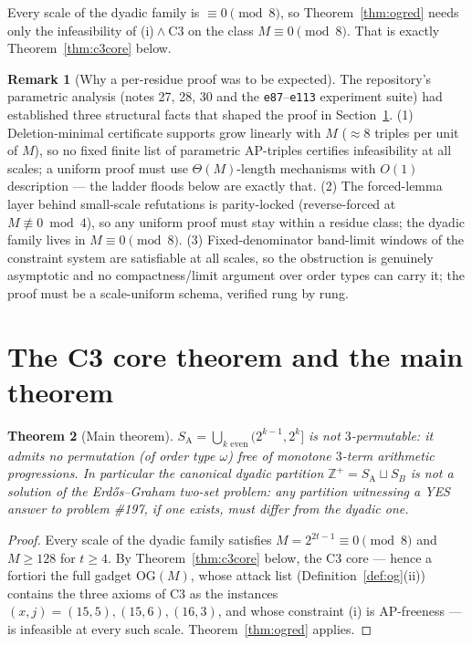 \documentclass[11pt]{article}
\newtheorem{theorem}{Theorem}
\theoremstyle{definition}
\newtheorem{remark}[theorem]{Remark}
\newcommand{\Z}{\mathbb{Z}}
\newcommand{\SA}{S_{\mathrm{A}}}
\newcommand{\OG}{\mathrm{OG}}
\begin{document}
Every scale of the dyadic family is $\equiv 0 \pmod 8$, so
Theorem~\ref{thm:ogred} needs only the infeasibility of
(i)${}\wedge{}\mathrm{C3}$ on the class $M \equiv 0 \pmod 8$. That is
exactly Theorem~\ref{thm:c3core} below.

\begin{remark}[Why a per-residue proof was to be expected]
The repository's parametric analysis (notes 27, 28, 30 and the
\texttt{e87}--\texttt{e113} experiment suite) had established three
structural facts that shaped the proof in Section~\ref{sec:c3}.
(1) Deletion-minimal certificate supports grow linearly with $M$
($\approx 8$ triples per unit of $M$), so no fixed finite list of
parametric AP-triples certifies infeasibility at all scales; a uniform
proof must use $\Theta(M)$-length mechanisms with $O(1)$ description ---
the ladder floods below are exactly that. (2) The forced-lemma layer
behind small-scale refutations is parity-locked (reverse-forced at
$M \not\equiv 0 \bmod 4$), so any uniform proof must stay within a
residue class; the dyadic family lives in $M \equiv 0 \pmod 8$.
(3) Fixed-denominator band-limit windows of the constraint system are
satisfiable at all scales, so the obstruction is genuinely asymptotic
and no compactness/limit argument over order types can carry it; the
proof must be a scale-uniform schema, verified rung by rung.
\end{remark}

\section{The C3 core theorem and the main theorem}\label{sec:c3}

\begin{theorem}[Main theorem]\label{thm:main}
$\SA = \bigcup_{k \text{ even}} (2^{k-1}, 2^k]$ is not $3$-permutable:
it admits no permutation (of order type $\omega$) free of monotone
$3$-term arithmetic progressions. In particular the canonical dyadic
partition $\Z^+ = \SA \sqcup S_B$ is not a solution of the
Erd\H{o}s--Graham two-set problem: any partition witnessing a YES answer
to problem \#197, if one exists, must differ from the dyadic one.
\end{theorem}

\begin{proof}
Every scale of the dyadic family satisfies $M = 2^{2t-1} \equiv 0
\pmod 8$ and $M \ge 128$ for $t \ge 4$. By Theorem~\ref{thm:c3core}
below, the C3 core --- hence a fortiori the full gadget $\OG(M)$, whose
attack list (Definition~\ref{def:og}(ii)) contains the three axioms of
$\mathrm{C3}$ as the instances $(x, j) = (15, 5), (15, 6), (16, 3)$,
and whose constraint (i) is AP-freeness
--- is infeasible at every such scale. Theorem~\ref{thm:ogred} applies.
\end{proof}
\end{document}
